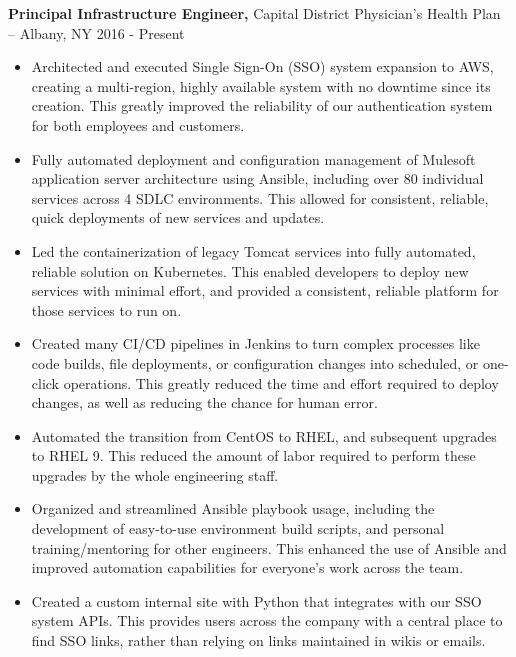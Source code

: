 \documentclass[11pt]{article}       %
\begin{document}
\textbf{Principal Infrastructure Engineer,} {Capital District Physician's Health Plan} -- Albany, NY \hfill 2016 - Present \\
\vspace{-9pt}
\begin{itemize}
  
  \item Architected and executed Single Sign-On (SSO) system expansion to AWS, creating a multi-region, highly available system with no downtime since its creation. This greatly improved the reliability of our authentication system for both employees and customers.
  
  \item Fully automated deployment and configuration management of Mulesoft application server architecture using Ansible, including over 80 individual services across 4 SDLC environments. This allowed for consistent, reliable, quick deployments of new services and updates.
  
  \item Led the containerization of legacy Tomcat services into fully automated, reliable solution on Kubernetes. This enabled developers to deploy new services with minimal effort, and provided a consistent, reliable platform for those services to run on.
  
  \item Created many CI/CD pipelines in Jenkins to turn complex processes like code builds, file deployments, or configuration changes into scheduled, or one-click operations. This greatly reduced the time and effort required to deploy changes, as well as reducing the chance for human error.
  
  \item Automated the transition from CentOS to RHEL, and subsequent upgrades to RHEL 9. This reduced the amount of labor required to perform these upgrades by the whole engineering staff.
  
  \item Organized and streamlined Ansible playbook usage, including the development of easy-to-use environment build scripts, and personal training/mentoring for other engineers. This enhanced the use of Ansible and improved automation capabilities for everyone's work across the team.
  
  \item Created a custom internal site with Python that integrates with our SSO system APIs. This provides users across the company with a central place to find SSO links, rather than relying on links maintained in wikis or emails.
  
\end{itemize}
\end{document}
